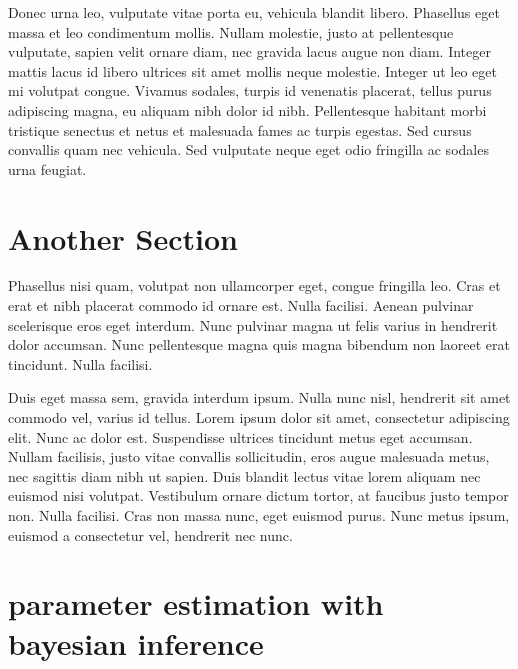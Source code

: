 Donec urna leo, vulputate vitae porta eu, vehicula blandit libero. Phasellus eget massa et leo condimentum mollis. Nullam molestie, justo at pellentesque vulputate, sapien velit ornare diam, nec gravida lacus augue non diam. Integer mattis lacus id libero ultrices sit amet mollis neque molestie. Integer ut leo eget mi volutpat congue. Vivamus sodales, turpis id venenatis placerat, tellus purus adipiscing magna, eu aliquam nibh dolor id nibh. Pellentesque habitant morbi tristique senectus et netus et malesuada fames ac turpis egestas. Sed cursus convallis quam nec vehicula. Sed vulputate neque eget odio fringilla ac sodales urna feugiat.

\section{Another Section}

Phasellus nisi quam, volutpat non ullamcorper eget, congue fringilla leo. Cras et erat et nibh placerat commodo id ornare est. Nulla facilisi. Aenean pulvinar scelerisque eros eget interdum. Nunc pulvinar magna ut felis varius in hendrerit dolor accumsan. Nunc pellentesque magna quis magna bibendum non laoreet erat tincidunt. Nulla facilisi.

Duis eget massa sem, gravida interdum ipsum. Nulla nunc nisl, hendrerit sit amet commodo vel, varius id tellus. Lorem ipsum dolor sit amet, consectetur adipiscing elit. Nunc ac dolor est. Suspendisse ultrices tincidunt metus eget accumsan. Nullam facilisis, justo vitae convallis sollicitudin, eros augue malesuada metus, nec sagittis diam nibh ut sapien. Duis blandit lectus vitae lorem aliquam nec euismod nisi volutpat. Vestibulum ornare dictum tortor, at faucibus justo tempor non. Nulla facilisi. Cras non massa nunc, eget euismod purus. Nunc metus ipsum, euismod a consectetur vel, hendrerit nec nunc.


\section{parameter estimation with bayesian inference}
